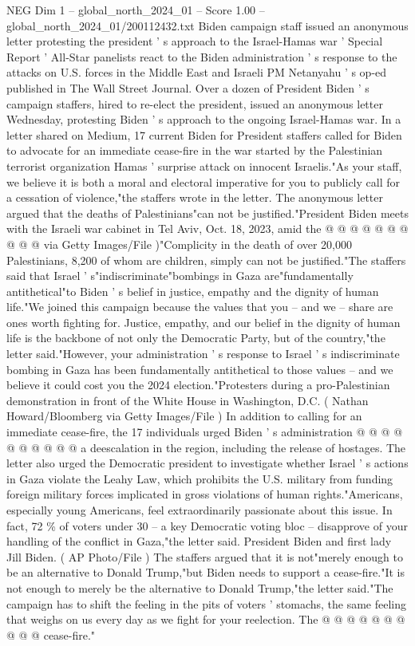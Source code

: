 \begin{textsample}{NEG Dim 1 – global\_north\_2024\_01 – Score 1.00 – global\_north\_2024\_01/200112432.txt}  \label{ex:f1_neg_335}
Biden campaign staff issued an anonymous letter protesting the president ' s approach to the Israel-Hamas war ' Special Report ' All-Star panelists react to the Biden administration ' s response to the attacks on U.S. forces in the Middle East and Israeli PM Netanyahu ' s op-ed published in The Wall Street Journal.
Over a dozen of President Biden ' s campaign staffers, hired to re-elect the president, issued an anonymous letter Wednesday, protesting Biden ' s approach to the ongoing Israel-Hamas war.
In a letter shared on Medium, 17 current Biden for President staffers called for Biden to advocate for an immediate cease-fire in the war started by the Palestinian terrorist organization Hamas ' surprise attack on innocent Israelis."As your staff, we believe it is both a moral and electoral imperative for you to publicly call for a cessation of violence,"the staffers wrote in the letter.
The anonymous letter argued that the deaths of Palestinians"can not be justified."President Biden meets with the Israeli war cabinet in Tel Aviv, Oct. 18, 2023, amid the @ @ @ @ @ @ @ @ @ @ via Getty Images/File )"Complicity in the death of over 20,000 Palestinians, 8,200 of whom are children, simply can not be justified."The staffers said that Israel ' s"indiscriminate"bombings in Gaza are"fundamentally antithetical"to Biden ' s belief in justice, empathy and the dignity of human life."We joined this campaign because the values that you -- and we -- share are ones worth fighting for.
Justice, empathy, and our belief in the dignity of human life is the backbone of not only the Democratic Party, but of the country,"the letter said."However, your administration ' s response to Israel ' s indiscriminate bombing in Gaza has been fundamentally antithetical to those values -- and we believe it could cost you the 2024 election."Protesters during a pro-Palestinian demonstration in front of the White House in Washington, D.C. ( Nathan Howard/Bloomberg via Getty Images/File ) In addition to calling for an immediate cease-fire, the 17 individuals urged Biden ' s administration @ @ @ @ @ @ @ @ @ @ a deescalation in the region, including the release of hostages.
The letter also urged the Democratic president to investigate whether Israel ' s actions in Gaza violate the Leahy Law, which prohibits the U.S. military from funding foreign military forces implicated in gross violations of human rights."Americans, especially young Americans, feel extraordinarily passionate about this issue.
In fact, 72 \% of voters under 30 -- a key Democratic voting bloc -- disapprove of your handling of the conflict in Gaza,"the letter said.
President Biden and first lady Jill Biden. ( AP Photo/File ) The staffers argued that it is not"merely enough to be an alternative to Donald Trump,"but Biden needs to support a cease-fire."It is not enough to merely be the alternative to Donald Trump,"the letter said."The campaign has to shift the feeling in the pits of voters ' stomachs, the same feeling that weighs on us every day as we fight for your reelection.
The @ @ @ @ @ @ @ @ @ @ cease-fire."

\end{textsample}
